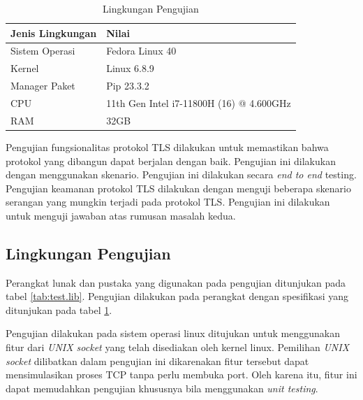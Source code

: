 \begin{table}[!h]
  \centering
  \caption{Lingkungan Pengujian} \label{tab:test.env}
  \begin{tabular}{|p{3cm}|p{6cm}|}
    \hline
    \textbf{Jenis Lingkungan} & \textbf{Nilai} \\ \hline
    Sistem Operasi & Fedora Linux 40 \\ \hline
    Kernel & Linux 6.8.9 \\ \hline
    Manager Paket & Pip 23.3.2 \\ \hline
    CPU & 11th Gen Intel i7-11800H (16) @ 4.600GHz \\ \hline
    RAM & 32GB \\ \hline
  \end{tabular}
\end{table}


Pengujian fungsionalitas protokol TLS dilakukan untuk memastikan bahwa protokol yang dibangun dapat berjalan dengan baik. Pengujian ini dilakukan dengan menggunakan skenario. Pengujian ini dilakukan secara \emph{end to end} testing. Pengujian keamanan protokol TLS dilakukan dengan menguji beberapa skenario serangan yang mungkin terjadi pada protokol TLS. Pengujian ini dilakukan untuk menguji jawaban atas rumusan masalah kedua.

\subsection{Lingkungan Pengujian}
Perangkat lunak dan pustaka yang digunakan pada pengujian ditunjukan pada tabel \ref{tab:test.lib}. Pengujian dilakukan pada perangkat dengan spesifikasi yang ditunjukan pada tabel \ref{tab:test.env}. 

Pengujian dilakukan pada sistem operasi linux ditujukan untuk menggunakan fitur dari \emph{UNIX socket} yang telah disediakan oleh kernel linux. Pemilihan \emph{UNIX socket} dilibatkan dalam pengujian ini dikarenakan fitur tersebut dapat mensimulasikan proses TCP tanpa perlu membuka port. Oleh karena itu, fitur ini dapat memudahkan pengujian khususnya bila menggunakan \emph{unit testing}.

